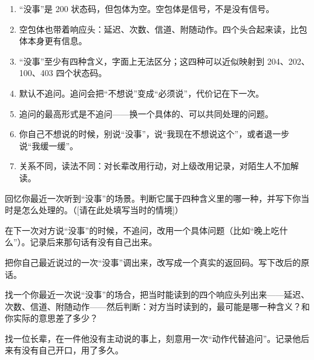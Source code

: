\begin{enumerate}[label=\bfseries\arabic*., leftmargin=2.4em, labelsep=0.7em,
                  itemsep=0.45em, topsep=0.2em, parsep=0.2em]
\item “没事”是 200 状态码，但包体为空。空包体是信号，不是没有信号。
\item 空包体也带着响应头：延迟、次数、信道、附随动作。四个头合起来读，比包体本身更有信息。
\item “没事”至少有四种含义，字面上无法区分；这四种可以近似映射到 204、202、100、403 四个状态码。
\item 默认不追问。追问会把“不想说”变成“必须说”，代价记在下一次。
\item 追问的最高形式是不追问——换一个具体的、可以共同处理的问题。
\item 你自己不想说的时候，别说“没事”，说“我现在不想说这个”，或者退一步说“我缓一缓”。
\item 关系不同，读法不同：对长辈改用行动，对上级改用记录，对陌生人不加解读。
\end{enumerate}

\begin{exercisessec}
\item 回忆你最近一次听到“没事”的场景。判断它属于四种含义里的哪一种，并写下你当时是怎么处理的。（[请在此处填写当时的情境]）

\item 在下一次对方说“没事”的时候，不追问，改用一个具体问题（比如“晚上吃什么”）。记录后来那句话有没有自己出来。

\item 把你自己最近说过的一次“没事”调出来，改写成一个真实的返回码。写下改后的原话。

\item 找一个你最近一次说“没事”的场合，把当时能读到的四个响应头列出来——延迟、次数、信道、附随动作——然后判断：对方当时读到的，最可能是哪一种含义？和你实际的意思差了多少？

\item 找一位长辈，在一件他没有主动说的事上，刻意用一次“动作代替追问”。记录他后来有没有自己开口，用了多久。
\end{exercisessec}

